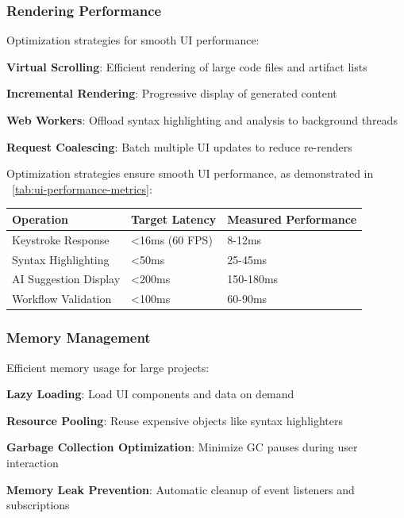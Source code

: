 \subsubsection*{Rendering Performance}

Optimization strategies for smooth UI performance:

\begin{compactlist}
    \item \textbf{Virtual Scrolling}: Efficient rendering of large code files and artifact lists
    \item \textbf{Incremental Rendering}: Progressive display of generated content
    \item \textbf{Web Workers}: Offload syntax highlighting and analysis to background threads
    \item \textbf{Request Coalescing}: Batch multiple UI updates to reduce re-renders
\end{compactlist}

Optimization strategies ensure smooth UI performance, as demonstrated in ~\ref{tab:ui-performance-metrics}:

\begin{center}
\begin{tabular}{@{}lll@{}}
\toprule
\textbf{Operation} & \textbf{Target Latency} & \textbf{Measured Performance} \\
\midrule
Keystroke Response & <16ms (60 FPS) & 8-12ms \\
Syntax Highlighting & <50ms & 25-45ms \\
AI Suggestion Display & <200ms & 150-180ms \\
Workflow Validation & <100ms & 60-90ms \\
\bottomrule
\end{tabular}
\label{tab:ui-performance-metrics}
\end{center}

\subsubsection*{Memory Management}

Efficient memory usage for large projects:

\begin{expandedlist}
    \item \textbf{Lazy Loading}: Load UI components and data on demand
    \item \textbf{Resource Pooling}: Reuse expensive objects like syntax highlighters
    \item \textbf{Garbage Collection Optimization}: Minimize GC pauses during user interaction
    \item \textbf{Memory Leak Prevention}: Automatic cleanup of event listeners and subscriptions
\end{expandedlist}

